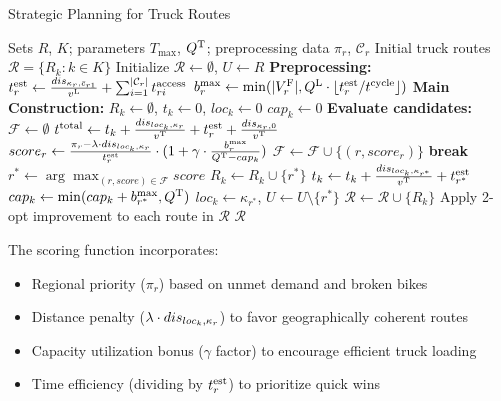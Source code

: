 \begin{algorithm}[htbp]
    \caption{Strategic Planning for Truck Routes}
    \label{alg:strategic}
    \begin{algorithmic}[1]
        \Require Sets $R$, $K$; parameters $T_{\max}$, $Q^{\text{T}}$; preprocessing data $\pi_r$, $\mathcal{C}_r$
        \Ensure Initial truck routes $\mathcal{R} = \{R_k : k \in K\}$
        \State Initialize $\mathcal{R} \leftarrow \emptyset$, $U \leftarrow R$ 
        \State \textbf{Preprocessing:}
        \State $t^{\text{est}}_r \leftarrow \frac{dis_{\kappa_r, \bar{c}_{r1}}}{v^{\text{L}}} + \sum_{i=1}^{|\mathcal{C}_r|} t_{ri}^{\text{access}}$ 
        \State $b^{\text{max}}_r \leftarrow \min(|V_r^{\text{F}}|, Q^{\text{L}} \cdot \lfloor t^{\text{est}}_r / t^{\text{cycle}} \rfloor)$ 
        \EndFor
        \State \textbf{Main Construction:}
        \State $R_k \leftarrow \emptyset$, $t_k \leftarrow 0$, $loc_k \leftarrow 0$ 
        \State $cap_k \leftarrow 0$ 
        \State \textbf{Evaluate candidates:}
        \State $\mathcal{F} \leftarrow \emptyset$ 
        \State $t^{\text{total}} \leftarrow t_k + \frac{dis_{loc_k, \kappa_r}}{v^{\text{T}}} + t^{\text{est}}_r + \frac{dis_{\kappa_r, 0}}{v^{\text{T}}}$
        \State $score_r \leftarrow \frac{\pi_r - \lambda \cdot dis_{loc_k, \kappa_r}}{t^{\text{est}}_r} \cdot (1 + \gamma \cdot \frac{b^{\text{max}}_r}{Q^{\text{T}} - cap_k})$
        \State $\mathcal{F} \leftarrow \mathcal{F} \cup \{(r, score_r)\}$
        \EndIf
        \EndFor
         \textbf{break} \EndIf
        \State $r^* \leftarrow \arg\max_{(r,score) \in \mathcal{F}} score$
        \State $R_k \leftarrow R_k \cup \{r^*\}$
        \State $t_k \leftarrow t_k + \frac{dis_{loc_k, \kappa_{r^*}}}{v^{\text{T}}} + t^{\text{est}}_{r^*}$
        \State $cap_k \leftarrow \min(cap_k + b^{\text{max}}_{r^*}, Q^{\text{T}})$
        \State $loc_k \leftarrow \kappa_{r^*}$, $U \leftarrow U \setminus \{r^*\}$
        \EndWhile
        \State $\mathcal{R} \leftarrow \mathcal{R} \cup \{R_k\}$
        \EndFor
        \State Apply 2-opt improvement to each route in $\mathcal{R}$
        \State \Return $\mathcal{R}$
    \end{algorithmic}
\end{algorithm}

The scoring function incorporates:
\begin{itemize}
    \item Regional priority ($\pi_r$) based on unmet demand and broken bikes
    \item Distance penalty ($\lambda \cdot dis_{loc_k, \kappa_r}$) to favor geographically coherent routes
    \item Capacity utilization bonus ($\gamma$ factor) to encourage efficient truck loading
    \item Time efficiency (dividing by $t^{\text{est}}_r$) to prioritize quick wins
\end{itemize}

